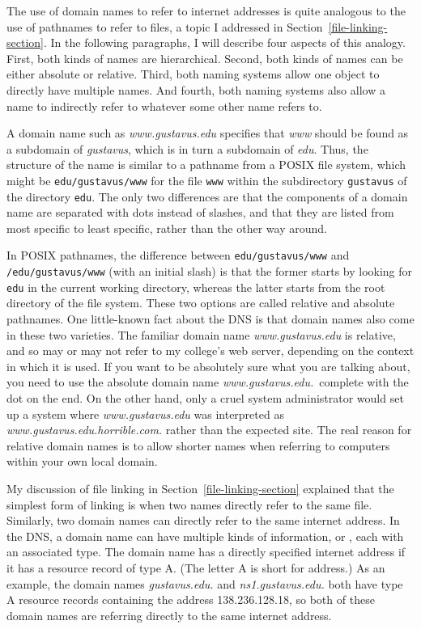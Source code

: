 The use of domain names to refer to internet addresses is quite
analogous to the use of pathnames to refer to files, a topic I
addressed in Section~\ref{file-linking-section}.  In the following
paragraphs, I will describe four aspects of this analogy.  First, both
kinds of names are hierarchical.  Second, both kinds of names can be
either absolute or relative.  Third, both naming systems allow one
object to directly have multiple names.  And fourth, both naming
systems also allow a name to indirectly refer to whatever some other
name refers to.

A domain name such as \textit{www.gustavus.edu} specifies that
\textit{www} should be found as a subdomain of \textit{gustavus}, which is
in turn a subdomain of \textit{edu}.  Thus, the structure of the name is
similar to a pathname from a POSIX file system, which might be
\verb|edu/gustavus/www| for the file \verb|www| within the
subdirectory \verb|gustavus| of the directory \verb|edu|.  The only
two differences are that the components of a domain name are separated
with dots instead of slashes, and that they are listed from most
specific to least specific, rather than the other way around.

In POSIX pathnames, the difference between \verb|edu/gustavus/www| and
\verb|/edu/gustavus/www| (with an initial slash) is that the former
starts by looking for \verb|edu| in the current working directory,
whereas the latter starts from the root directory of the file system.
These two options are called relative and absolute pathnames.  One
little-known fact about the DNS is that domain names also come in
these two varieties.  The familiar domain name \textit{www.gustavus.edu}
is relative, and so may or may not refer to my college's web server,
depending on the context in which it is used.  If you want to be
absolutely sure what you are talking about, you need to use the
absolute domain name \textit{www.gustavus.edu.}\ complete with the dot on
the end.  On the other hand, only a cruel system administrator would
set up a system where \textit{www.gustavus.edu} was interpreted as
\textit{www.gustavus.edu.horrible.com.} rather than the expected site.
The real reason for relative domain names is to allow shorter names
when referring to computers within your own local domain.

My discussion of file linking in Section~\ref{file-linking-section}
explained that the simplest form of linking is when two names directly
refer to the same file.  Similarly, two domain names can directly
refer to the same internet address.  In the DNS, a domain name can
have multiple kinds of information, or ,
each with an associated type.  The domain name has a directly
specified internet address if it has a resource record of type A.
(The letter A is short for address.)  As an example, the domain names
\textit{gustavus.edu.} and \textit{ns1.gustavus.edu.} both have type A
resource records containing the address 138.236.128.18, so both
of these domain names are referring directly to the same internet
address.

